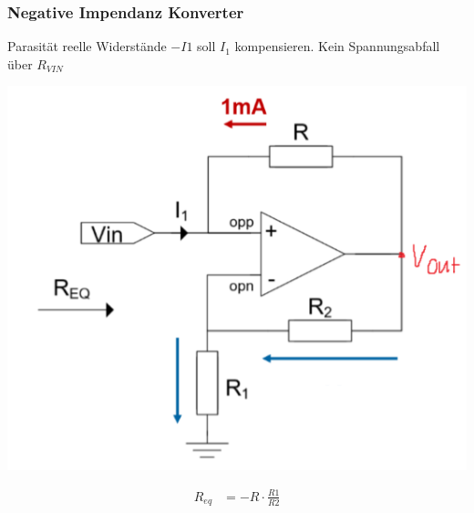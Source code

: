 \subsubsection{Negative Impendanz Konverter}
Parasität reelle Widerstände $-I1$ soll $I_1$ kompensieren. Kein Spannungsabfall über $R_{VIN}$\\
\begin{minipage}{0.20\textwidth}
	\includegraphics[width=\linewidth,keepaspectratio=true]{./Images/opamp_nic}
\end{minipage}%
\begin{minipage}{0.30\textwidth}
	\begin{align*}
		R_{eq} &= -R\cdot \frac{R1}{R2}
	\end{align*}
\end{minipage}

